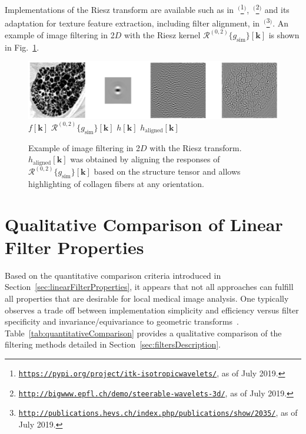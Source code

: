 \documentclass[fleqn,a4paper,oneside,openany]{book}
\begin{document}
Implementations of the Riesz transform are available such as in~\cite{Her2016}$^($\footnote{\texttt{\url{https://pypi.org/project/itk-isotropicwavelets/}}, as of July 2019.}$^)$,~\cite{ChU2012}$^($\footnote{\texttt{\url{http://bigwww.epfl.ch/demo/steerable-wavelets-3d/}}, as of July 2019.}$^)$ and its adaptation for texture feature extraction, including filter alignment, in~\cite{DMP2017}$^($\footnote{\texttt{\url{http://publications.hevs.ch/index.php/publications/show/2035/}}, as of July 2019.}$^)$.
An example of image filtering in 2$D$ with the Riesz kernel $\mathcal{R}^{(0,2)}
\{g_{\text{sim}}\}[\boldsymbol{k}]$ is shown in Fig.~\ref{fig:RieszExample}.

%
\begin{figure}
\centering
\includegraphics[trim = 0 0 0 0, clip, width=\linewidth]{Riesz_example.png}\\
$f[\boldsymbol{k}]$
\hspace{2cm}
$\mathcal{R}^{(0,2)}
\{g_{\text{sim}}\}[\boldsymbol{k}]$
\hspace{1.8cm}
$h[\boldsymbol{k}]$
\hspace{2.8cm}
$h_{\text{aligned}}[\boldsymbol{k}]$
\caption{Example of image filtering in 2$D$ with the Riesz transform.
$h_{\text{aligned}}[\boldsymbol{k}]$ was obtained by aligning the responses of $\mathcal{R}^{(0,2)}
\{g_{\text{sim}}\}[\boldsymbol{k}]$ based on the structure tensor and allows highlighting of collagen fibers at any orientation.}
  \label{fig:RieszExample}
\end{figure}
%
\section{Qualitative Comparison of Linear Filter Properties}\label{sec:qualitativeComparison}
%
Based on the quantitative comparison criteria introduced in Section~\ref{sec:linearFilterProperties}, it appears that not all approaches can fulfill all properties that are desirable for local medical image analysis.
One typically observes a trade off between implementation simplicity and efficiency versus filter specificity and invariance/equivariance to geometric transforms~\cite{Depeursinge2018}.
Table~\ref{tab:quantitativeComparison} provides a qualitative comparison of the filtering methods detailed in Section~\ref{sec:filtersDescription}.
\end{document}
